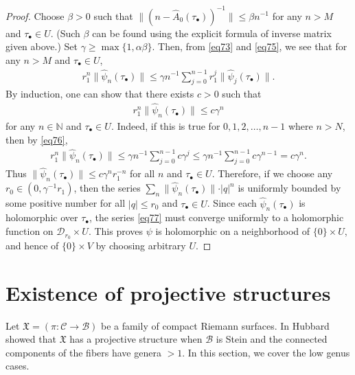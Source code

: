 \documentclass[12pt,a4paper,notitlepage]{article}
\theoremstyle{definition}
\theoremstyle{plain}
\newcommand{\fk}{\mathfrak}
\newcommand{\mc}{\mathcal}
\newcommand{\wht}{\widehat}
\newcommand{\mbb}{\mathbb}
\newcommand{\blt}{\bullet}
\numberwithin{equation}{section}
\begin{document}
\begin{proof}
	
	Choose $\beta>0$ such that  $\lVert (n-\wht A_0(\tau_\blt))^{-1} \lVert\leq \beta n^{-1}$ for any $n> M$ and $\tau_\blt\in U$. (Such $\beta$ can be found using the explicit formula of inverse matrix given above.) Set $\gamma\geq\max\{1,\alpha\beta\}$. Then, from \eqref{eq73} and \eqref{eq75}, we see that for any $n>M$ and $\tau_\blt\in U$,
	\begin{align}
	r_1^n\lVert \wht\psi_n(\tau_\blt) \lVert\leq \gamma n^{-1}\sum_{j=0}^{n-1}r_1^j\lVert \wht\psi_j(\tau_\blt) \lVert.\label{eq76}
	\end{align}
	By induction, one can show that there exists $c>0$ such that
	\begin{align*}
	r_1^n\lVert\wht\psi_n(\tau_\blt)\lVert\leq c\gamma^n 
	\end{align*}
	for any $n\in\mbb N$ and $\tau_\blt\in U$. Indeed, if this is true for $0,1,2,\dots,n-1$ where $n>N$, then by \eqref{eq76},
	\begin{align*}
	r_1^n\lVert \wht\psi_n(\tau_\blt) \lVert\leq \gamma n^{-1}\sum_{j=0}^{n-1}c\gamma^j\leq \gamma n^{-1}\sum_{j=0}^{n-1}c\gamma^{n-1}=c\gamma^n.
	\end{align*}
	Thus $\lVert\wht\psi_n(\tau_\blt)\lVert\leq c\gamma^nr_1^{-n}$ for all $n$ and $\tau_\blt\in U$. Therefore, if we choose any $r_0\in(0,\gamma^{-1}r_1)$, then   the series $\sum_n\lVert \wht \psi_n(\tau_\blt) \lVert \cdot|q|^n$ is uniformly bounded by some positive number for all  $|q|\leq r_0$ and $\tau_\blt\in U$. Since each $\wht\psi_n(\tau_\blt)$ is holomorphic over $\tau_\blt$, the series \eqref{eq77} must converge uniformly to a holomorphic function on $\mc D_{r_0}\times U$. This proves $\psi$ is holomorphic on a neighborhood of $\{0\}\times U$, and hence of $\{0\}\times V$ by choosing arbitrary $U$.
\end{proof}



















\section{Existence of projective structures}\label{lb27}


Let $\fk X=(\pi:\mc C\rightarrow\mc B)$ be a family of compact Riemann surfaces. In \cite[Lemma 5]{Hub81} Hubbard showed that $\fk X$ has a projective structure when $\mc B$ is Stein and the connected components of the fibers have genera $>1$. In this section, we cover the low genus cases.
\end{document}

